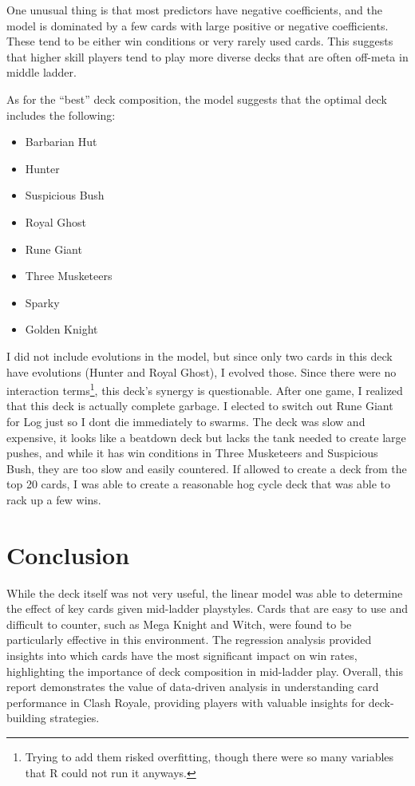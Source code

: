\documentclass{article}
\begin{document}
One unusual thing is that most predictors have negative coefficients, and the model is dominated by a few cards with large positive or negative coefficients. These tend to be either win conditions or very rarely used cards. This suggests that higher skill players tend to play more diverse decks that are often off-meta in middle ladder. 

As for the ``best'' deck composition, the model suggests that the optimal deck includes the following:

\begin{itemize}
    \item Barbarian Hut
    \item Hunter
    \item Suspicious Bush
    \item Royal Ghost
    \item Rune Giant
    \item Three Musketeers
    \item Sparky
    \item Golden Knight
\end{itemize}

I did not include evolutions in the model, but since only two cards in this deck have evolutions (Hunter and Royal Ghost), I evolved those. Since there were no interaction terms\footnote{Trying to add them risked overfitting, though there were so many variables that R could not run it anyways.}, this deck's synergy is questionable. After one game, I realized that this deck is actually complete garbage. I elected to switch out Rune Giant for Log just so I dont die immediately to swarms. The deck was slow and expensive, it looks like a beatdown deck but lacks the tank needed to create large pushes, and while it has win conditions in Three Musketeers and Suspicious Bush, they are too slow and easily countered. If allowed to create a deck from the top 20 cards, I was able to create a reasonable hog cycle deck that was able to rack up a few wins.

\section{Conclusion}

While the deck itself was not very useful, the linear model was able to determine the effect of key cards given mid-ladder playstyles. Cards that are easy to use and difficult to counter, such as Mega Knight and Witch, were found to be particularly effective in this environment. The regression analysis provided insights into which cards have the most significant impact on win rates, highlighting the importance of deck composition in mid-ladder play. Overall, this report demonstrates the value of data-driven analysis in understanding card performance in Clash Royale, providing players with valuable insights for deck-building strategies.
\end{document}
